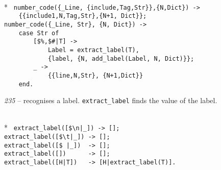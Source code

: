 \begin{flushleft}
\label{analysis_4_6}
\\*
\tt
\noindent{}%
\verb&number_code({_Line, {include,Tag,Str}},{N,Dict}) ->&\\
\noindent{}%
\verb&    {{include1,N,Tag,Str},{N+1, Dict}};&\\
\noindent{}%
\verb&number_code({_Line, Str}, {N, Dict}) ->&\\
\noindent{}%
\verb&    case Str of&\\
\noindent{}%
\verb&        [$%,$#|T] ->&\\
\noindent{}%
\verb&            Label = extract_label(T),&\\
\noindent{}%
\verb&            {label, {N, add_label(Label, N, Dict)}};&\\
\noindent{}%
\verb&        _ ->&\\
\noindent{}%
\verb&            {{line,N,Str}, {N+1,Dict}}&\\
\noindent{}%
\verb&    end.&\\
\end{flushleft}

{\sl 235} -- recognises a label.         \verb+extract_label+ 
finds the value of the label.

\begin{flushleft}
\label{analysis_5_6}
\\*
\tt
\noindent{}%
\verb&extract_label([$\n|_]) -> [];&\\
\noindent{}%
\verb&extract_label([$\t|_]) -> [];&\\
\noindent{}%
\verb&extract_label([$ |_])  -> [];&\\
\noindent{}%
\verb&extract_label([])      -> [];&\\
\noindent{}%
\verb&extract_label([H|T])   -> [H|extract_label(T)].&\\
\end{flushleft}

